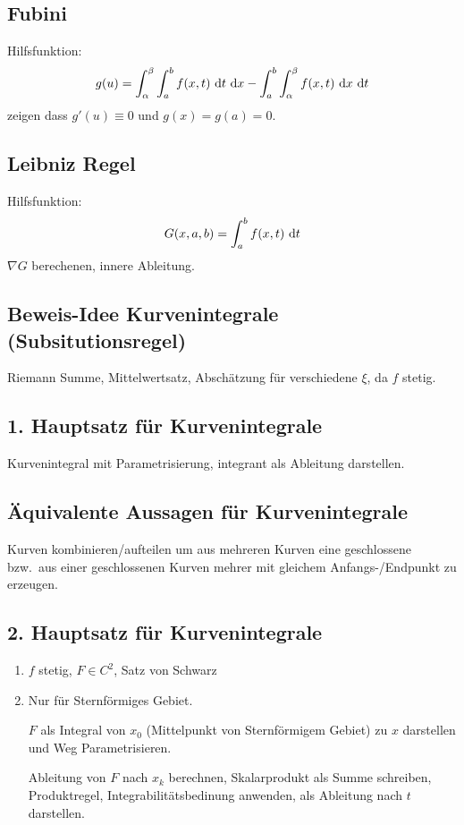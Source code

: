  \subsection{Fubini}
 Hilfsfunktion:
 \begin{equation*}
     g(u) = \int_\alpha^\beta \int_a^b f(x,t) \text{ d}t \text{ d}x - \int_a^b \int_\alpha^\beta
     f(x,t) \text{ d}x \text{ d}t
 \end{equation*}
 zeigen dass $g'(u) \equiv 0$ und $g(x) = g(a) = 0$.

 \subsection{Leibniz Regel}
 Hilfsfunktion:
 \begin{equation*}
     G(x,a,b) = \int_a^b f(x,t) \text{ d}t
 \end{equation*}
 $\nabla G$ berechenen, innere Ableitung.

 \subsection{Beweis-Idee Kurvenintegrale (Subsitutionsregel)}
 Riemann Summe, Mittelwertsatz, Abschätzung für verschiedene $\xi$, da $f$ stetig.

 \subsection{1. Hauptsatz für Kurvenintegrale}
 Kurvenintegral mit Parametrisierung, integrant als Ableitung darstellen.

 \subsection{Äquivalente Aussagen für Kurvenintegrale}
 Kurven kombinieren/aufteilen um aus mehreren Kurven eine geschlossene bzw.\ aus
 einer geschlossenen Kurven mehrer mit gleichem Anfangs-/Endpunkt zu erzeugen.

 \subsection{2. Hauptsatz für Kurvenintegrale}
 \begin{enumerate}
     \item $f$ stetig, $F \in C^2$, Satz von Schwarz
     \item Nur für Sternförmiges Gebiet.

        $F$ als Integral von $x_0$ (Mittelpunkt von Sternförmigem Gebiet) zu $x$
        darstellen und Weg Parametrisieren.

        Ableitung von $F$ nach $x_k$ berechnen, Skalarprodukt als Summe schreiben,
        Produktregel, Integrabilitätsbedinung anwenden, als Ableitung nach $t$
        darstellen.
 \end{enumerate}

